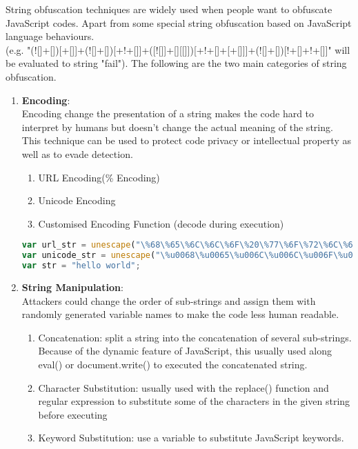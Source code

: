 \documentclass[11pt]{article}
\begin{document}
\begin{enumerate}
	String obfuscation techniques are widely used when people want to obfuscate JavaScript codes. Apart from some special string obfuscation based on JavaScript language behaviours. \\ (e.g. "(![]+[])[+[]]+(![]+[])[+!+[]]+([![]]+[][[]])[+!+[]+[+[]]]+(![]+[])[!+[]+!+[]]" will be evaluated to string "fail"). The following are the two main categories of string obfuscation.
	\begin{enumerate}
 		\item \textbf{Encoding}: \\
 		 Encoding change the presentation of a string makes the code hard to interpret by humans but doesn't change the actual meaning of the string. This technique can be used to protect code privacy or intellectual property as well as to evade detection. 
		\begin{enumerate}
			\item URL Encoding(\% Encoding)
			\item Unicode Encoding
			\item Customised Encoding Function (decode during execution)
 		\end{enumerate}
			\begin{lstlisting}[language=JavaScript, title=(encoding examples)]
var url_str = unescape("\%68\%65\%6C\%6C\%6F\%20\%77\%6F\%72\%6C\%64"));
var unicode_str = unescape("\%u0068\%u0065\%u006C\%u006C\%u006F\%u0020                          \%u0077\%u006F\%u0072\%u006C\%u0064");
var str = "hello world";
			\end{lstlisting}	
		\item  \textbf{String Manipulation}: \\
		Attackers could change the order of sub-strings and assign them with randomly generated variable names to make the code less human readable.
		\begin{enumerate}
			\item Concatenation: split a string into the concatenation of several sub-strings. Because of the dynamic feature of JavaScript, this usually used along eval() or document.write() to executed the concatenated string.
			\item Character Substitution: usually used with the replace() function and regular expression to substitute some of the characters in the given string before executing
 			\item Keyword Substitution: use a variable to substitute JavaScript keywords.

\end{enumerate}
\end{enumerate}
\end{enumerate}
\end{document}
